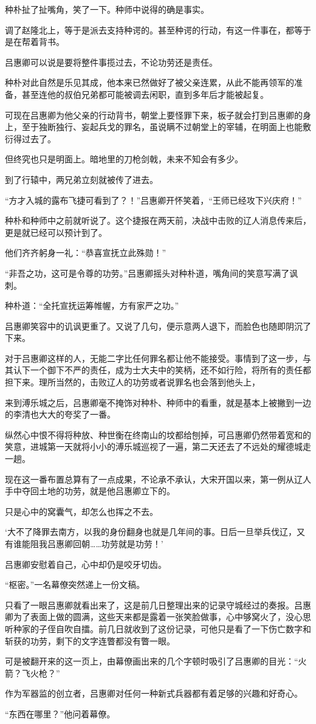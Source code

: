 种朴扯了扯嘴角，笑了一下。种师中说得的确是事实。

调了赵隆北上，等于是派去支持种谔的。甚至种谔的行动，有这一件事在，都等于是在帮着背书。

吕惠卿可以说是要将整件事揽过去，不论功劳还是责任。

种朴对此自然是乐见其成，他本来已然做好了被父亲连累，从此不能再领军的准备，甚至连他的叔伯兄弟都可能被调去闲职，直到多年后才能被起复。

可现在吕惠卿为他父亲的行动背书，朝堂上要怪罪下来，板子就会打到吕惠卿的身上，至于独断独行、妄起兵戈的罪名，虽说瞒不过朝堂上的宰辅，在明面上也能敷衍得过去了。

但终究也只是明面上。暗地里的刀枪剑戟，未来不知会有多少。

到了行辕中，两兄弟立刻就被传了进去。

“方才入城的露布飞捷可看到了？！”吕惠卿开怀笑着，“王师已经攻下兴庆府！”

种朴和种师中之前就听说了。这个捷报在两天前，决战中击败的辽人消息传来后，更是就已经可以预计到了。

他们齐齐躬身一礼：“恭喜宣抚立此殊勋！”

“非吾之功，这可是令尊的功劳。”吕惠卿摇头对种朴道，嘴角间的笑意写满了讽刺。

种朴道：“全托宣抚运筹帷幄，方有家严之功。”

吕惠卿笑容中的讥讽更重了。又说了几句，便示意两人退下，而脸色也随即阴沉了下来。

对于吕惠卿这样的人，无能二字比任何罪名都让他不能接受。事情到了这一步，与其认下一个御下不严的责任，成为士大夫中的笑柄，还不如行险，将所有的责任都担下来。理所当然的，击败辽人的功劳或者说罪名也会落到他头上，

来到溥乐城之后，吕惠卿毫不掩饰对种朴、种师中的看重，就是基本上被撇到一边的李清也大大的夸奖了一番。

纵然心中恨不得将种放、种世衡在终南山的坟都给刨掉，可吕惠卿仍然带着宽和的笑意，进城第一天就将小小的溥乐城巡视了一遍，第二天还去了不远处的耀德城走一趟。

现在这一番布置总算有了一点成果，不论承不承认，大宋开国以来，第一例从辽人手中夺回土地的功劳，就是他吕惠卿立下的。

只是心中的窝囊气，却怎么也挥之不去。

‘大不了降罪去南方，以我的身份翻身也就是几年间的事。日后一旦举兵伐辽，又有谁能阻我吕惠卿回朝……功劳就是功劳！’

吕惠卿安慰着自己，心中却仍是咬牙切齿。

“枢密。”一名幕僚突然递上一份文稿。

只看了一眼吕惠卿就看出来了，这是前几日整理出来的记录守城经过的奏报。吕惠卿为了表面上做的圆满，这些天来都是露着一张笑脸做事，心中够窝火了，没心思听种家的子侄自吹自擂。前几日就收到了这份记录，可他只是看了一下伤亡数字和斩获的功劳，剩下的文字连瞥都没有瞥一眼。

可是被翻开来的这一页上，由幕僚画出来的几个字顿时吸引了吕惠卿的目光：“火箭？飞火枪？”

作为军器监的创立者，吕惠卿对任何一种新式兵器都有着足够的兴趣和好奇心。

“东西在哪里？”他问着幕僚。
